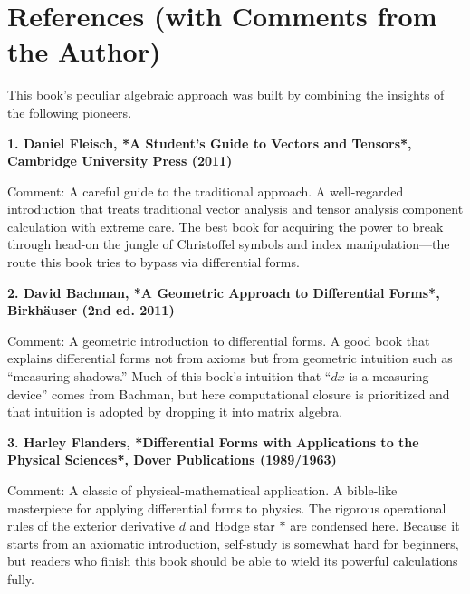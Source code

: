 \documentclass[a4paper,12pt,openany]{book}
\begin{document}
\newpage

\hypertarget{references-with-comments-from-the-author}{%
\chapter{References (with Comments from the
Author)}\label{references-with-comments-from-the-author}}

This book's peculiar algebraic approach was built by combining the
insights of the following pioneers.

\par\vspace{0.35em}\par

\textbf{1. Daniel Fleisch, *A Student's Guide to Vectors and Tensors*, Cambridge University Press (2011)}

Comment: A careful guide to the traditional approach. A well-regarded
introduction that treats traditional vector analysis and tensor analysis
component calculation with extreme care. The best book for acquiring the
power to break through head-on the jungle of Christoffel symbols and
index manipulation—the route this book tries to bypass via
differential forms.

\par\vspace{0.35em}\par

\textbf{2. David Bachman, *A Geometric Approach to Differential Forms*, Birkhäuser (2nd ed. 2011)}

Comment: A geometric introduction to differential forms. A good book
that explains differential forms not from axioms but from geometric
intuition such as ``measuring shadows.'' Much of this book's intuition
that ``\(dx\) is a measuring device'' comes from Bachman, but here
computational closure is prioritized and that intuition is adopted by
dropping it into matrix algebra.

\par\vspace{0.35em}\par

\textbf{3. Harley Flanders, *Differential Forms with Applications to the Physical Sciences*, Dover Publications (1989/1963)}

Comment: A classic of physical-mathematical application. A bible-like
masterpiece for applying differential forms to physics. The rigorous
operational rules of the exterior derivative \(d\) and Hodge star
\(\ast\) are condensed here. Because it starts from an axiomatic
introduction, self-study is somewhat hard for beginners, but readers who
finish this book should be able to wield its powerful calculations
fully.
\end{document}
